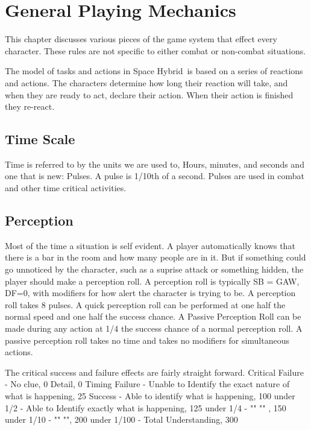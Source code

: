 \chapter{General Playing Mechanics}

This chapter discusses various pieces of the game system that 
effect every character. These rules are not specific to either 
combat or non-combat situations. 

The model of tasks and actions in Space Hybrid\ is based on a series of reactions and 
actions. The characters determine how long their reaction will take, and  
when they are ready to act, declare their action. When their action is finished 
they re-react. 

\section{Time Scale}

Time is referred to by the units we are used to, Hours, minutes, and seconds 
and one that is new: Pulses. A {pulse} is 1/10th of a second. Pulses are
used in combat and other time critical activities.

\section{Perception}

Most of the time a situation is self evident. A player automatically
knows that there is a bar in the room and how many people are in it.
But if something could go unnoticed by the character, such as a suprise 
attack or something hidden, the player should make a {perception roll}. 
A perception roll is typically SB = GAW, DF=0, with modifiers for 
how alert the character is trying to be. A perception roll takes
8 pulses. A quick perception roll can be performed at one half the normal speed
and one half the success chance. A {Passive Perception Roll} can be made 
during any action at 1/4 the success chance of a normal perception roll. A
passive perception roll takes no time and takes no modifiers for 
simultaneous actions.

The critical success and failure effects are fairly straight forward.
Critical Failure - No clue, 0 Detail, 0 Timing
Failure - Unable to Identify the exact nature of what is happening, 25%
Success - Able to identify what is happening, 100%
under 1/2 - Able to Identify exactly what is happening, 125%
under 1/4 - "" "" , 150%
under 1/10 - "" "", 200%
under 1/100 - Total Understanding, 300%


